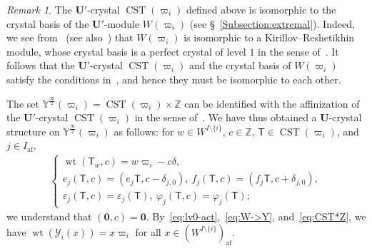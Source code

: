 \documentclass[10pt]{amsart}
\theoremstyle{definition}\newtheorem{defi}[theo]{Definition}
\theoremstyle{remark}\newtheorem{rema}[theo]{Remark}
\newcommand{\BZ}{\mathbb{Z}}
\newcommand\bm[1]{\boldsymbol{#1}}
\newcommand{\U}{\mathbf{U}}
\newcommand{\si}{\frac{\infty}{2}}
\DeclareMathOperator{\af}{af}
\DeclareMathOperator{\wt}{wt}
\DeclareMathOperator{\CST}{CST}
\begin{document}
\begin{rema} \label{rem:KR}
The 
$\U'$-crystal 
$\CST (\varpi_i)$ 
defined above is isomorphic to the crystal basis of the $\U'$-module 
$W(\varpi_i)$ (see \S~\ref{Subsection:extremal}).
Indeed, we see from~\cite[Theorem~5.17~(ix)]{K02}
(see also~\cite[Remark~3.3]{N}) 
that 
$W(\varpi_i)$ 
is isomorphic to a Kirillov--Reshetikhin module, 
whose crystal basis is a perfect crystal of level $1$ 
in the sense of~\cite[Definition~1.1.1]{KMN}. 
It follows that the $\U'$-crystal 
$\CST (\varpi_i)$ 
and the crystal basis of 
$W(\varpi_i)$ 
satisfy the conditions in~\cite[Proposition~1.2.1 for $l = 1$]{KMN}, 
and hence they must be isomorphic to each other.
\end{rema}

The set 
$\mathbb{Y}^{\si}(\varpi_i) = \CST (\varpi_i) \times \BZ$ 
can be identified with the affinization of the $\U'$-crystal 
$\CST (\varpi_i)$
in the sense of~\cite[\S~4.2]{K02}. 
We have thus obtained a $\U$-crystal structure on 
$\mathbb{Y}^{\si}(\varpi_i)$
as follows: 
for 
$w \in W^{I \setminus \{ i \}}$, 
$c \in \BZ$, 
$\mathsf{T} \in \CST (\varpi_i)$, 
and 
$j \in I_{\af}$, 
\begin{align} \label{eq:CST*Z}
\begin{cases}
\wt (\mathsf{T}_w,c) = w\varpi_i - c\delta , \\%
e_j (\mathsf{T},c) = (e_j \mathsf{T} , c - \delta_{j,0}), \ 
f_j (\mathsf{T},c) = (f_j \mathsf{T} , c + \delta_{j,0}), \\%
\varepsilon_j(\mathsf{T},c) = \varepsilon_j(\mathsf{T}), \ 
\varphi_j(\mathsf{T},c) = \varphi_j(\mathsf{T}) ;
\end{cases}
\end{align}
we understand that 
$(\bm{0},c) = \bm{0}$. 
By~\eqref{eq:lv0-act},~\eqref{eq:W->Y}, and~\eqref{eq:CST*Z}, 
we have 
$\wt (\mathcal{Y}_i(x)) = x\varpi_i$ 
for all 
$x \in (W^{I \setminus \{ i \}})_{\af}$.
\end{document}
